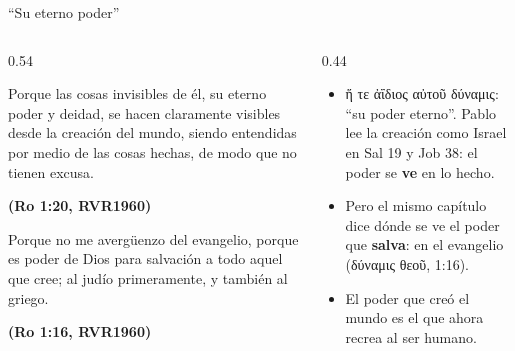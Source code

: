 \documentclass[hyperref={bookmarks=false},aspectratio=169]{beamer}
\newcommand{\grc}[1]{\foreignlanguage{ancientgreek}{#1}}
\newcommand{\fuente}[1]{\par\hfill{\upshape\bfseries\footnotesize\textcolor{azul}{#1}}}
\newcommand{\destacar}[1]{\textbf{\textcolor{azul}{#1}}}
\begin{document}
\begin{frame}{``Su eterno poder''}
\begin{columns}[c,onlytextwidth]
\begin{column}{0.54\textwidth}
\begin{cita}Porque las cosas invisibles de él, su eterno poder y deidad, se hacen claramente visibles desde la creación del mundo, siendo entendidas por medio de las cosas hechas, de modo que no tienen excusa.\fuente{(Ro 1:20, RVR1960)}\end{cita}
\begin{cita}Porque no me avergüenzo del evangelio, porque es poder de Dios para salvación a todo aquel que cree; al judío primeramente, y también al griego.\fuente{(Ro 1:16, RVR1960)}\end{cita}
\end{column}
\begin{column}{0.44\textwidth}\small
\begin{itemize}
\item \grc{ἥ τε ἀΐδιος αὐτοῦ δύναμις}: ``su poder eterno''. Pablo lee la creación como Israel en Sal 19 y Job 38: el poder se \destacar{ve} en lo hecho.
\item Pero el mismo capítulo dice dónde se ve el poder que \destacar{salva}: en el evangelio (\grc{δύναμις θεοῦ}, 1:16).
\item El poder que creó el mundo es el que ahora recrea al ser humano.
\end{itemize}
\end{column}
\end{columns}
\end{frame}
\end{document}
